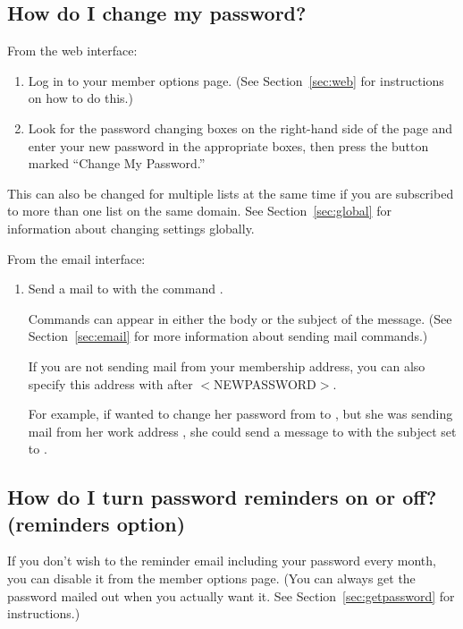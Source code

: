\documentclass{howto}
\begin{document}
\subsection{How do I change my password?}

From the web interface:
\begin{enumerate}
	\item Log in to your member options page.  (See Section~\ref{sec:web} for 
   instructions on how to do this.)

	\item Look for the password changing boxes on the right-hand side of the
	page and enter your new password in the appropriate boxes, then press the
	button marked ``Change My Password.''
\end{enumerate}

This can also be changed for multiple lists at the same time if you are subscribed to 
more than one list on the same domain.  See Section~\ref{sec:global} for 
information about changing settings globally.


From the email interface:
\begin{enumerate}
	\item Send a mail to  with the command 
	.  

	Commands can appear
	in either the body or the subject of the message.  (See 
	Section~\ref{sec:email} for more information about sending mail
	commands.)  

	If you are not sending mail from your membership address, you can also
	specify this address with  after $<$NEWPASSWORD$>$.
	
	For example, if  wanted to change her 
	password from  to , but she was sending mail from 
	her work address , she could send a message
	to  with the subject set to 
	.
\end{enumerate}

\subsection{How do I turn password reminders on or off? (reminders option)}
If you don't wish to the reminder email including your password every month, 
you can disable it from the member options page.  (You can always get the
password mailed out when you actually want it.  See 
Section~\ref{sec:getpassword} for instructions.)
\end{document}
